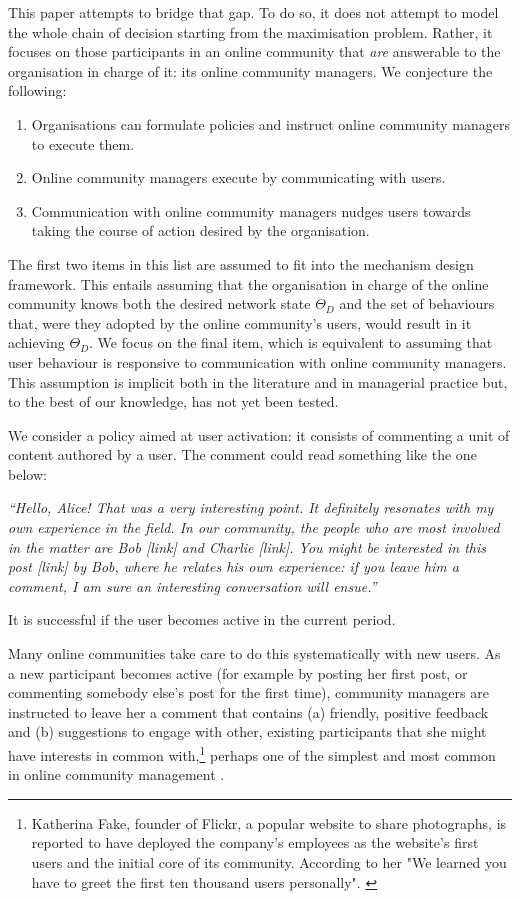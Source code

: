 This paper attempts to bridge that gap. To do so, it does not attempt to model the whole chain of decision starting from the maximisation problem. Rather, it focuses on those participants in an online community that \textit{are} answerable to the organisation in charge of it: its online community managers. We conjecture the following:

\begin{enumerate}
 	\item Organisations can formulate policies and instruct online community managers to execute them.
	 \item Online community managers execute by communicating with users.
	 \item Communication with online community managers nudges users towards taking the course of action desired by the organisation. 
 \end{enumerate}
 
The first two items in this list are assumed to fit into the mechanism design framework. This entails assuming that the organisation in charge of the online community knows both the desired network state $\Theta_D$ and the set of behaviours that, were they adopted by the online community's users, would result in it achieving $\Theta_D$. We focus on the final item, which is equivalent to assuming that user behaviour is responsive to communication with online community managers. This assumption is implicit both in the literature and in managerial practice but, to the best of our knowledge, has not yet been tested.

We consider a policy aimed at user activation: it consists of commenting a unit of content authored by a user. The comment could read something like the one below:

\emph{``Hello, Alice! That was a very interesting point. It definitely resonates with my own experience in the field. In our community, the people who are most involved in the matter are Bob [link] and Charlie [link]. You might be interested in this post [link] by Bob, where he relates his own experience: if you leave him a comment, I am sure an interesting conversation will ensue.''}

It is successful if the user becomes active in the current period.  

Many online communities take care to do this systematically with new users. As a new participant becomes active (for example by posting her first post, or commenting somebody else's post for the first time), community managers are instructed to leave her a comment that contains (a) friendly, positive feedback and (b) suggestions to engage with other, existing participants that she might have interests in common with,\footnote{Katherina Fake, founder of Flickr, a popular website to share photographs, is reported to have deployed the company's employees as the website's first users and the initial core of its community. According to her "We learned you have to greet the first ten thousand users personally". \cite{shirky2008here}} perhaps one of the simplest and most common in online community management \cite{rheingold1993virtual, shirky2008here}. 

